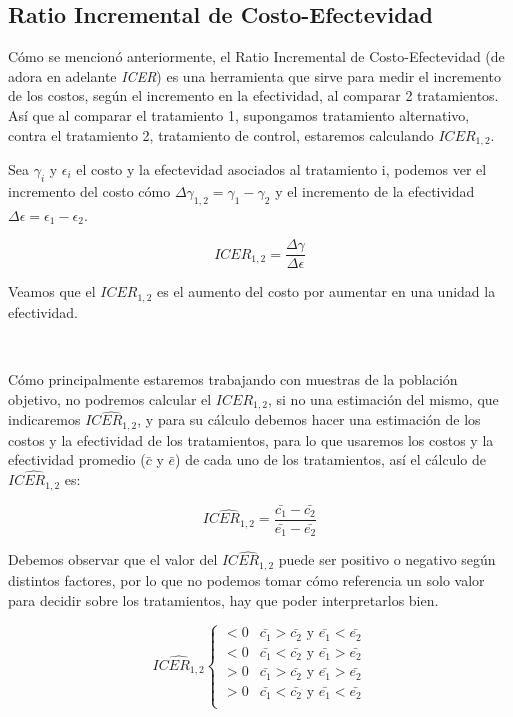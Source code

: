 \documentclass{article}
\begin{document}
\subsection{Ratio Incremental de Costo-Efectevidad}

Cómo se mencionó anteriormente, el Ratio Incremental de Costo-Efectevidad (de adora en adelante \textit{ICER}) es una herramienta que sirve para medir el incremento de los costos, según el incremento en la efectividad, al comparar 2 tratamientos. Así que al comparar el tratamiento 1, supongamos tratamiento alternativo, contra el tratamiento 2, tratamiento de control, estaremos calculando $ICER_{1,2}$.

Sea $\gamma_i$ y $\epsilon_i$ el costo y la efectevidad asociados al tratamiento i, podemos ver el incremento del costo cómo $\Delta\gamma_{1,2}=\gamma_1-\gamma_2$ y el incremento de la efectividad $\Delta\epsilon=\epsilon_1-\epsilon_2$.

 \begin{equation}
    ICER_{1,2}= \frac{\Delta\gamma}{\Delta\epsilon} 
\end{equation}

Veamos que el $ICER_{1,2}$ es el aumento del costo por aumentar en una unidad la efectividad.

\

Cómo principalmente estaremos trabajando con muestras de la población objetivo, no podremos calcular el $ICER_{1,2}$, si no una estimación del mismo, que indicaremos $\widehat{ICER_{1,2}}$, y para su cálculo debemos hacer una estimación de los costos y la efectividad de los tratamientos, para lo que usaremos los costos y la efectividad promedio ($\bar{c}$ y $\bar{e}$) de cada uno de los tratamientos, así el cálculo de $\widehat{ICER_{1,2}}$ es:

\begin{equation}
    \widehat{ICER_{1,2}}= \frac{\bar{c_1}-\bar{c_2}}{\bar{e_1}-\bar{e_2}}
\end{equation}

Debemos observar que el valor del $\widehat{ICER_{1,2}}$ puede ser positivo o negativo según distintos factores, por lo que no podemos tomar cómo referencia un solo valor para decidir sobre los tratamientos, hay que poder interpretarlos bien.

\begin{equation}
    \widehat{ICER_{1,2}}
    \begin{cases}
        <0 & \bar{c_1} > \bar{c_2} \text{   y   }   \bar{e_1} < \bar{e_2} \\
        <0 & \bar{c_1} < \bar{c_2} \text{   y   }   \bar{e_1} > \bar{e_2} \\
        >0 & \bar{c_1} > \bar{c_2} \text{   y   }   \bar{e_1} > \bar{e_2} \\
        >0 & \bar{c_1} < \bar{c_2} \text{   y   }   \bar{e_1} < \bar{e_2} \\
    \end{cases}
\end{equation}
\end{document}
